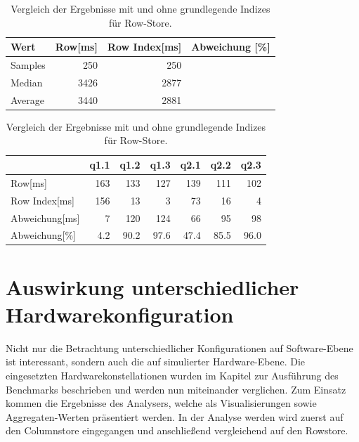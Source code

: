 \begin{table}[H]
    \begin{tabularx}{\textwidth}{lrrr}
        \toprule
        Wert                & Row[ms] & Row Index[ms]   & Abweichung [\%]\\
        \toprule
        Samples             & 250     &  250            &       \\
        \midrule
        Median              & 3426    &  2877           &       \\
        Average             & 3440    &  2881           &       \\
        \bottomrule
    \end{tabularx}
\caption{Vergleich der Ergebnisse mit und ohne grundlegende Indizes für Row-Store.}
\label{tab:basic_index_row}
\end{table}

\begin{table}[H]
    \begin{tabularx}{\linewidth}{lrrrrrr}
        \toprule
                &   q1.1    &   q1.2&	q1.3&	q2.1&	q2.2&	q2.3 \\
        \toprule
        Row[ms]	        &	163	    &	133	&	127	&	139	&	111	&	102  \\
        Row Index[ms]   &   156     &   13	&   3	&   73	&   16	&   4    \\
        Abweichung[ms]  &   7       &   120 &   124 &   66  &   95  &   98   \\
        Abweichung[\%]  &   4.2     &   90.2&   97.6&   47.4&   85.5&   96.0 \\    
\bottomrule
\end{tabularx}
\caption{Vergleich der Ergebnisse mit und ohne grundlegende Indizes für Row-Store.}
\label{tab:basic_index_row}
\end{table}
\section{Auswirkung unterschiedlicher Hardwarekonfiguration}\label{auswertung:hardware}

Nicht nur die Betrachtung unterschiedlicher Konfigurationen auf Software-Ebene ist interessant, sondern auch die auf simulierter Hardware-Ebene. Die eingesetzten Hardwarekonstellationen wurden im Kapitel zur Ausführung des Benchmarks beschrieben und werden nun miteinander verglichen. Zum Einsatz kommen die Ergebnisse des Analysers, welche als Visualisierungen sowie Aggregaten-Werten präsentiert werden. In der Analyse werden wird zuerst auf den Columnstore eingegangen und anschließend vergleichend auf den Rowstore. 

